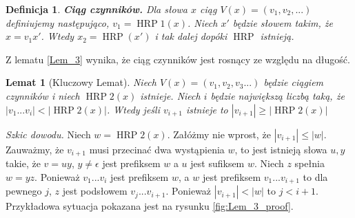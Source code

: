 \documentclass{article}
\newtheorem{definition}{Definicja}[section]
\newtheorem{lemma}{Lemat}[section]
\DeclareMathOperator{\HRP}{HRP}
\begin{document}
\begin{definition}
\textbf{\textit{Ciąg czynników.}} Dla słowa $x$ ciąg $V(x) = (v_1, v_2, ...)$ definiujemy następująco, $v_1 = \HRP1(x)$. Niech $x'$ będzie słowem takim, że $x = v_1x'$. Wtedy $x_2 = \HRP(x')$ i tak dalej dopóki $\HRP$ istnieją.
\end{definition}
Z lematu \ref{Lem_3} wynika, że ciąg czynników jest rosnący ze względu na długość.

\begin{lemma}[Kluczowy Lemat]\label{Lem_Key}
Niech $V(x) = (v_1, v_2, v_3 ...)$ będzie ciągiem czynników i niech $\HRP2(x)$ istnieje.
Niech $i$ będzie największą liczbą taką, że $|v_1...v_i| < |\HRP2(x)|$.
Wtedy jeśli $v_{i+1}$ istnieje to $|v_{i+1}| \geq |\HRP2(x)|$
\end{lemma}
\textit{Szkic dowodu.}
Niech $w = \HRP2(x)$. Załóżmy nie wprost, że $|v_{i+1}| \leq |w|$. 
Zauważmy, że $v_{i+1}$ musi przecinać dwa wystąpienia $w$, to jest istnieją słowa $u, y$ takie, że $v = uy$, $y \neq \epsilon$ jest prefiksem $w$ a $u$ jest sufiksem $w$.
Niech $z$ spełnia $w = yz$. Ponieważ $v_1...v_i$ jest prefiksem $w$, a $w$ jest prefiksem $v_1...v_{i+1}$ to dla pewnego $j$, $z$ jest podsłowem $v_j...v_{i+1}$.
Ponieważ $|v_{i+1}|<|w|$ to $j < i+1$. Przykładowa sytuacja pokazana jest na rysunku \ref{fig:Lem_3_proof}.
\end{document}

